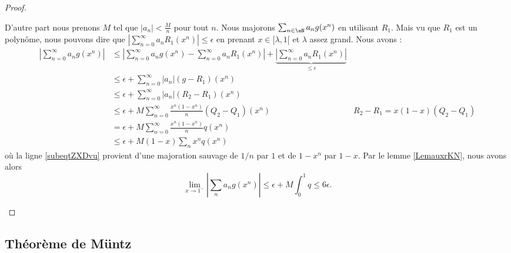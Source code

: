 \begin{proof}
\begin{subproof}
        D'autre part nous prenons \( M\) tel que \( | a_n |<\frac{ M }{ n }\) pour tout \( n\). Nous majorons \( \sum_{n \in \eN}a_ng(x^n)\) en utilisant \( R_1\). Mais vu que \( R_1\) est un polynôme, nous pouvons dire que \( | \sum_{n=0}^{\infty}a_nR_1(x^n) |\leq \epsilon\) en prenant \( x\in\mathopen[ \lambda , 1 [\) et \( \lambda\) assez grand. Nous avons :
        \begin{subequations}
            \begin{align}
                \left| \sum_{n=0}^{\infty}a_ng(x^n) \right| &\leq\left| \sum_{n=0}^{\infty}a_ng(x^n)-\sum_{n=0}^{\infty}a_nR_1(x^n) \right| +\underbrace{\left| \sum_{n=0}^{\infty}a_nR_1(x^n) \right|}_{\leq \epsilon} \\
                &\leq \epsilon+\sum_{n=0}^{\infty}| a_n |(g-R_1)(x^n)\\
                &\leq \epsilon+\sum_{n=0}^{\infty}| a_n |(R_2-R_1)(x^n)\\
                &\leq \epsilon+M\sum_{n=0}^{\infty}\frac{ x^n(1-x^n) }{ n }(Q_2-Q_1)(x^n)   &R_2-R_1=x(1-x)(Q_2-Q_1)\\
                &=\epsilon+M\sum_{n=0}^{\infty}\frac{ x^n(1-x^n) }{ n }q(x^n)\\
                &\leq \epsilon+M(1-x)\sum_nx^nq(x^n)   \label{subeqtZXDvu} 
            \end{align}
        \end{subequations}
        où la ligne \eqref{subeqtZXDvu} provient d'une majoration sauvage de \( 1/n\) par \( 1\) et de \( 1-x^n\) par \( 1-x\). Par le lemme \ref{LemauxrKN}, nous avons alors
        \begin{equation}
            \lim_{x\to 1^-} | \sum_na_ng(x^n) |\leq \epsilon+M\int_0^1q\leq 6\epsilon.
        \end{equation}
    \end{subproof}
\end{proof}

\subsection{Théorème de Müntz}

